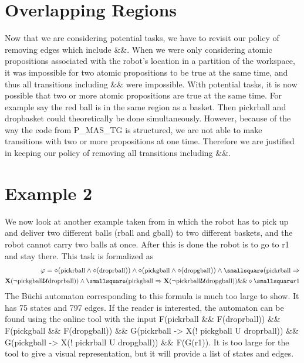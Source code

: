 \section{Overlapping Regions}
Now that we are considering potential tasks, we have to revisit our policy of removing edges which include \&\&. When we were only considering atomic propositions associated with the robot's location in a partition of the workspace, it was impossible for two atomic propositions to be true at the same time, and thus all transitions including \&\& were impossible. With potential tasks, it is now possible that two or more atomic propositions are true at the same time. For example say the red ball is in the same region as a basket. Then pickrball and dropbasket could theoretically be done simultaneously. However, because of the way the code from P\_MAS\_TG \cite{pMasGit} is structured, we are not able to make transitions with two or more propositions at one time. Therefore we are justified in keeping our policy of removing all transitions including \&\&. 





\section{Example 2}
We now look at another example taken from \cite{guo15} in which the robot has to pick up and deliver two different balls (rball and gball) to two different baskets, and the robot cannot carry two balls at once. After this is done the robot is to go to r1 and stay there. This task is formalized as 
\begin{align*}
\small \varphi = \diamond (\text{pickrball} \wedge \diamond (\text{droprball})) \wedge \diamond(\text{pickgball} \wedge \diamond (\text{dropgball})) \wedge \smallsquare (\text{pickrball} \Rightarrow \\
 \small \textbf{X}(\neg \text{pickgball} \U \text{droprball})) \wedge \smallsquare (\text{pickgball} \Rightarrow \textbf{X} (\neg \text{pickrball} \U \text{dropgball})) \&\& \diamond \smallsquare r1
\end{align*}
The B\"uchi automaton corresponding to this formula is much too large to show. It has 75 states and 797 edges. If the reader is interested, the automaton can be found using the online tool \cite{ltlbuchiwebsite} with the input F(pickrball \&\& F(droprball)) \&\& F(pickgball \&\& F(dropgball)) \&\& G(pickrball -> X(! pickgball U droprball)) \&\& G(pickgball -> X(! pickrball U dropgball)) \&\& F(G(r1)). It is too large for the tool to give a visual representation, but it will provide a list of states and edges.  

